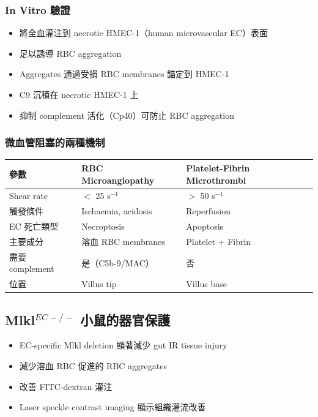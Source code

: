 \documentclass[12pt,a4paper]{article}
\begin{document}
\subsubsection{In Vitro 驗證}

\begin{itemize}
    \item 將全血灌注到 necrotic HMEC-1（human microvascular EC）表面
    \item 足以誘導 RBC aggregation
    \item Aggregates 通過受損 RBC membranes 錨定到 HMEC-1
    \item C9 沉積在 necrotic HMEC-1 上
    \item 抑制 complement 活化（Cp40）可防止 RBC aggregation
\end{itemize}

\subsubsection{微血管阻塞的兩種機制}

\begin{longtable}{p{4cm}p{5cm}p{5cm}}
\toprule
\textbf{參數} & \textbf{RBC Microangiopathy} & \textbf{Platelet-Fibrin Microthrombi} \\
\midrule
\endhead
Shear rate & $<$ 25 s$^{-1}$ & $>$ 50 s$^{-1}$ \\
觸發條件 & Ischaemia, acidosis & Reperfusion \\
EC 死亡類型 & Necroptosis & Apoptosis \\
主要成分 & 溶血 RBC membranes & Platelet + Fibrin \\
需要 complement & 是（C5b-9/MAC） & 否 \\
位置 & Villus tip & Villus base \\
\bottomrule
\end{longtable}

\subsection{Mlkl$^{EC-/-}$ 小鼠的器官保護}

\begin{itemize}
    \item EC-specific Mlkl deletion 顯著減少 gut IR tissue injury
    \item 減少溶血 RBC 促進的 RBC aggregates
    \item 改善 FITC-dextran 灌注
    \item Laser speckle contrast imaging 顯示組織灌流改善
\end{itemize}
\end{document}
